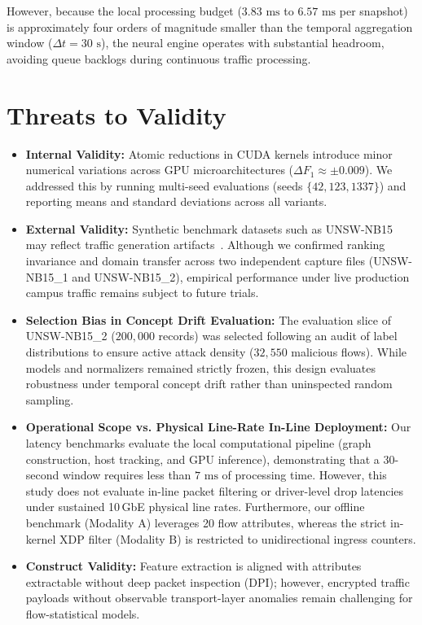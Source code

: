 \documentclass[conference]{IEEEtran}
\begin{document}
However, because the local processing budget ($3.83\text{ ms}$ to $6.57\text{ ms}$ per snapshot) is approximately four orders of magnitude smaller than the temporal aggregation window ($\Delta t = 30\text{ s}$), the neural engine operates with substantial headroom, avoiding queue backlogs during continuous traffic processing.

\section{Threats to Validity}

\begin{itemize}
    \item \textbf{Internal Validity:} Atomic reductions in CUDA kernels introduce minor numerical variations across GPU microarchitectures ($\Delta F_1 \approx \pm 0.009$). We addressed this by running multi-seed evaluations (seeds $\{42, 123, 1337\}$) and reporting means and standard deviations across all variants.
    \item \textbf{External Validity:} Synthetic benchmark datasets such as UNSW-NB15 may reflect traffic generation artifacts~\cite{ring2019survey}. Although we confirmed ranking invariance and domain transfer across two independent capture files (UNSW-NB15\_1 and UNSW-NB15\_2), empirical performance under live production campus traffic remains subject to future trials.
    \item \textbf{Selection Bias in Concept Drift Evaluation:} The evaluation slice of UNSW-NB15\_2 ($200{,}000$ records) was selected following an audit of label distributions to ensure active attack density ($32{,}550$ malicious flows). While models and normalizers remained strictly frozen, this design evaluates robustness under temporal concept drift rather than uninspected random sampling.
    \item \textbf{Operational Scope vs. Physical Line-Rate In-Line Deployment:} Our latency benchmarks evaluate the local computational pipeline (graph construction, host tracking, and GPU inference), demonstrating that a 30-second window requires less than $7\text{ ms}$ of processing time. However, this study does not evaluate in-line packet filtering or driver-level drop latencies under sustained 10\,GbE physical line rates. Furthermore, our offline benchmark (Modality A) leverages 20 flow attributes, whereas the strict in-kernel XDP filter (Modality B) is restricted to unidirectional ingress counters.
    \item \textbf{Construct Validity:} Feature extraction is aligned with attributes extractable without deep packet inspection (DPI); however, encrypted traffic payloads without observable transport-layer anomalies remain challenging for flow-statistical models.
\end{itemize}
\end{document}
